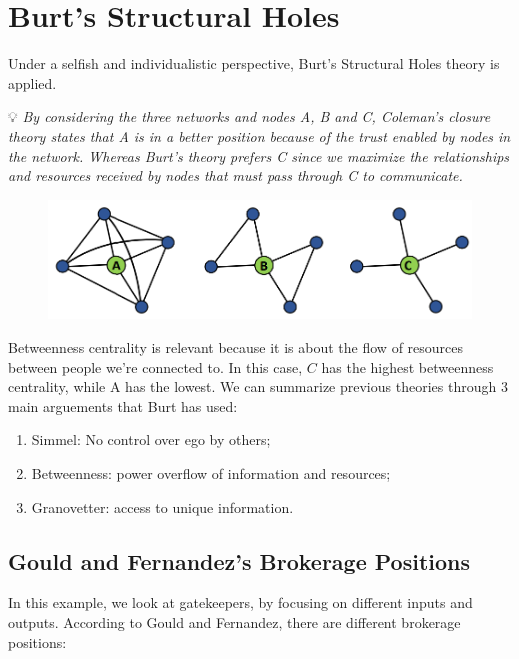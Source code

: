 \documentclass[
  notitlepage,
  onecolumn,
  openany]{book}
\providecommand{\tightlist}{%
  \setlength{\itemsep}{0pt}\setlength{\parskip}{0pt}}
\begin{document}
\hypertarget{burts-structural-holes}{%
\section{Burt's Structural Holes}\label{burts-structural-holes}}

Under a selfish and individualistic perspective, Burt's Structural Holes
theory is applied.

💡 \emph{By considering the three networks and nodes A, B and C, Coleman's
closure theory states that A is in a better position because of the
trust enabled by nodes in the network. Whereas Burt's theory prefers C
since we maximize the relationships and resources received by nodes that
must pass through C to communicate.}

\begin{figure}[h!]

{\centering \includegraphics[width=0.5\linewidth]{images/07-Triads and structural holes/Untitled 2} 

}

\end{figure}

Betweenness centrality is relevant because it is about the flow of
resources between people we're connected to. In this case, \(C\) has the
highest betweenness centrality, while A has the lowest. We can summarize
previous theories through \(3\) main arguements that Burt has used:

\begin{enumerate}
\def\labelenumi{\arabic{enumi}.}
\tightlist
\item
  Simmel: No control over ego by others;
\item
  Betweenness: power overflow of information and resources;
\item
  Granovetter: access to unique information.
\end{enumerate}

\hypertarget{gould-and-fernandezs-brokerage-positions}{%
\subsection{Gould and Fernandez's Brokerage Positions}\label{gould-and-fernandezs-brokerage-positions}}

In this example, we look at gatekeepers, by focusing on different inputs
and outputs. According to Gould and Fernandez, there are different
brokerage positions:
\end{document}
